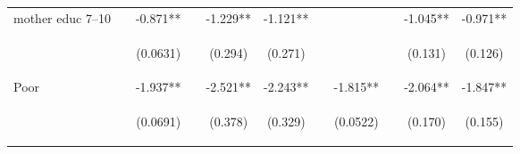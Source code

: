 \documentclass{article}[11pt,subeqn]
\begin{document}
\begin{spacing}{1.5}
\begin{sidewaystable}[!htbp]
\begin{center}
\begin{tabular}{lcccccccccc}
mother educ 7--10	&		&	-0.871**	&		&	-1.229**	&	-1.121**	&		&		&		&	-1.045**	&	-0.971**	\\
\vspace{4pt} & \begin{footnotesize}			\end{footnotesize} & \begin{footnotesize}	(0.0631)	\end{footnotesize} & \begin{footnotesize}		\end{footnotesize} & \begin{footnotesize}	(0.294)	\end{footnotesize} & \begin{footnotesize}	(0.271)	\end{footnotesize} & \begin{footnotesize}		\end{footnotesize} & \begin{footnotesize}		\end{footnotesize} & \begin{footnotesize}		\end{footnotesize} & \begin{footnotesize}	(0.131)	\end{footnotesize} & \begin{footnotesize}	(0.126)	\end{footnotesize} \\
Poor	&		&	-1.937**	&		&	-2.521**	&	-2.243**	&		&	-1.815**	&		&	-2.064**	&	-1.847**	\\
\vspace{4pt} & \begin{footnotesize}			\end{footnotesize} & \begin{footnotesize}	(0.0691)	\end{footnotesize} & \begin{footnotesize}		\end{footnotesize} & \begin{footnotesize}	(0.378)	\end{footnotesize} & \begin{footnotesize}	(0.329)	\end{footnotesize} & \begin{footnotesize}		\end{footnotesize} & \begin{footnotesize}	(0.0522)	\end{footnotesize} & \begin{footnotesize}		\end{footnotesize} & \begin{footnotesize}	(0.170)	\end{footnotesize} & \begin{footnotesize}	(0.155)	\end{footnotesize} \\

\end{tabular}
\end{center}
\end{sidewaystable}
\end{spacing}
\end{document}
